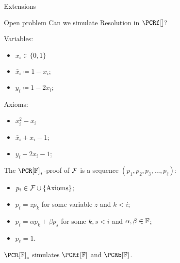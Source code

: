 \begin{frame}{Extensions}

    \pause
    \begin{block}{Open problem}
        Can we simulate Resolution in $\PCRf[]$?
    \end{block}

    \pause

    \begin{minipage}{0.48\linewidth}
        Variables:
        \begin{itemize}
            \item $x_i \in \{0, 1\}$
            \item $\bar{x}_i \coloneqq 1 - x_i$;
            \item $y_i \coloneqq 1 - 2 x_i$;
        \end{itemize}
    \end{minipage}
    \begin{minipage}{0.48\linewidth}
        Axioms:
        \begin{itemize}
            \item $x^2_i - x_i$
            \item $\bar{x}_i + x_i - 1$;
            \item $y_i + 2 x_i - 1$;
        \end{itemize}
    \end{minipage}

    \vspace{0.4cm}
    \pause

    The $\PCR[\field]_*$-proof of $\mathcal{F}$ is a sequence $(p_1, p_2, p_3, \dots, p_{\ell})$:
    \pause
    \begin{itemize}
        \item $p_i \in \mathcal{F} \cup \{\text{Axioms}\}$;
        \pause
        \item $p_i = z p_k$ for some variable $z$ and $k < i$;
        \pause    
        \item $p_i = \alpha p_k + \beta p_s$ for some $k, s < i$ and $\alpha, \beta \in \mathbb{F}$;
        \pause
        \item $p_{\ell} = 1$.
    \end{itemize}

    \pause
    
    $\PCR[\field]_*$ simulates $\PCRf[\field]$ and $\PCRb[\field]$.
\end{frame}


